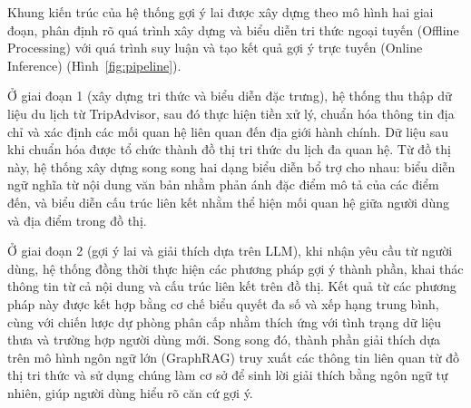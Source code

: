 \documentclass[journal,onecolumn,10pt]{IEEEtran}
\begin{document}
Khung kiến trúc của hệ thống gợi ý lai được xây dựng theo mô hình hai giai đoạn, phân định rõ quá trình xây dựng và biểu diễn tri thức ngoại tuyến (Offline Processing) với quá trình suy luận và tạo kết quả gợi ý trực tuyến (Online Inference) (Hình~\ref{fig:pipeline}).

Ở giai đoạn 1 (xây dựng tri thức và biểu diễn đặc trưng), hệ thống thu thập dữ liệu du lịch từ TripAdvisor, sau đó thực hiện tiền xử lý, chuẩn hóa thông tin địa chỉ và xác định các mối quan hệ liên quan đến địa giới hành chính. Dữ liệu sau khi chuẩn hóa được tổ chức thành đồ thị tri thức du lịch đa quan hệ. Từ đồ thị này, hệ thống xây dựng song song hai dạng biểu diễn bổ trợ cho nhau: biểu diễn ngữ nghĩa từ nội dung văn bản nhằm phản ánh đặc điểm mô tả của các điểm đến, và biểu diễn cấu trúc liên kết nhằm thể hiện mối quan hệ giữa người dùng và địa điểm trong đồ thị.

Ở giai đoạn 2 (gợi ý lai và giải thích dựa trên LLM), khi nhận yêu cầu từ người dùng, hệ thống đồng thời thực hiện các phương pháp gợi ý thành phần, khai thác thông tin từ cả nội dung và cấu trúc liên kết trên đồ thị. Kết quả từ các phương pháp này được kết hợp bằng cơ chế biểu quyết đa số và xếp hạng trung bình, cùng với chiến lược dự phòng phân cấp nhằm thích ứng với tình trạng dữ liệu thưa và trường hợp người dùng mới. Song song đó, thành phần giải thích dựa trên mô hình ngôn ngữ lớn (GraphRAG) truy xuất các thông tin liên quan từ đồ thị tri thức và sử dụng chúng làm cơ sở để sinh lời giải thích bằng ngôn ngữ tự nhiên, giúp người dùng hiểu rõ căn cứ gợi ý.
\end{document}
